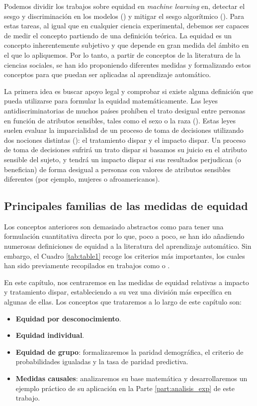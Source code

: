 \documentclass[oneside,openright,titlepage,numbers=noenddot,openany,headinclude,footinclude=true,
cleardoublepage=empty,abstractoff,BCOR=5mm,paper=a4,fontsize=12pt,main=spanish]{scrreprt}
\begin{document}
\clearpage

Podemos dividir los trabajos sobre equidad en \textit{machine learning} en, detectar el sesgo y discriminación en los modelos (\cite{detect2012}) y mitigar el sesgo algorítmico (\cite{mitigate2017}). Para estas tareas, al igual que en cualquier ciencia experimental, debemos ser capaces de medir el concepto partiendo de una definición teórica. La equidad es un concepto inherentemente subjetivo y que depende en gran medida del ámbito en el que lo apliquemos. Por lo tanto, a partir de conceptos de la literatura de la ciencias sociales, se han ido proponiendo diferentes medidas y formalizando estos conceptos para que puedan ser aplicadas al aprendizaje automático.

La primera idea es buscar apoyo legal y comprobar si existe alguna definición que pueda utilizarse para formular la equidad matemáticamente. Las leyes antidiscriminatorias de muchos países prohíben el trato desigual entre personas en función de atributos sensibles, tales como el sexo o la raza (\cite{ley1964}). Estas leyes suelen evaluar la imparcialidad de un proceso de toma de decisiones utilizando dos nociones distintas (\cite{bigdata2016}): el tratamiento dispar y el impacto dispar. Un proceso de toma de decisiones sufrirá un trato dispar si basamos su juicio en el atributo sensible del sujeto, y tendrá un impacto dispar si sus resultados perjudican (o benefician) de forma desigual a personas con valores de atributos sensibles diferentes (por ejemplo, mujeres o afroamericanos).

\subsection{Principales familias de las medidas de equidad}

Los conceptos anteriores son demasiado abstractos como para tener una formulación cuantitativa directa por lo que, poco a poco, se han ido añadiendo numerosas definiciones de equidad a la literatura del aprendizaje automático. Sin embargo, el Cuadro \ref{tab:table1} recoge los criterios más importantes, los cuales han sido previamente recopilados en trabajos como \cite{formalizing2018} o \cite{definitions2018}.  

En este capítulo, nos centraremos en las medidas de equidad relativas a impacto y tratamiento dispar, estableciendo a su vez una división más específica en algunas de ellas. Los conceptos que trataremos a lo largo de este capítulo son:

\begin{itemize}
    \item \textbf{Equidad por desconocimiento}.
    \item \textbf{Equidad individual}.
    \item \textbf{Equidad de grupo}: formalizaremos la paridad demográfica, el criterio de probabilidades igualadas y la tasa de paridad predictiva.
    \item \textbf{Medidas causales}: analizaremos su base matemática y desarrollaremos un ejemplo práctico de su aplicación en la Parte \ref{part:analisis_exp} de este trabajo.
\end{itemize}
\end{document}
